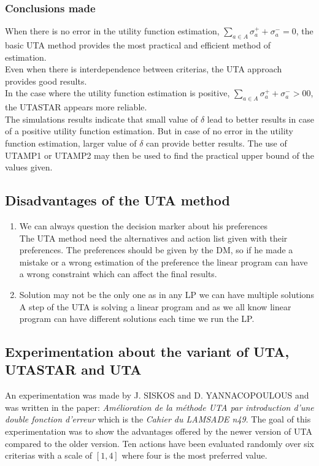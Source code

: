\documentclass{report}
\begin{document}
\subsubsection{Conclusions made}
When there is no error in the utility function estimation, $ \sum_{a \in A} \sigma _{a}^{+} + \sigma _{a}^{-} = 0$, the basic UTA method provides the most practical and efficient method of estimation. \\
Even when there is interdependence between criterias, the UTA approach provides good results. \\
In the case where the utility function estimation is positive, $ \sum_{a \in A} \sigma _{a}^{+} + \sigma _{a}^{-} >0 0$, the UTASTAR appears more reliable.\\
The simulations results indicate that small value of $\delta$ lead to better results in case of a positive utility function estimation. But in case of no error in the utility function estimation, larger value of $\delta$ can provide better results. The use of UTAMP1 or UTAMP2 may then be used to find the practical upper bound of the values given. 

\subsection{Disadvantages of the UTA method}
\begin{enumerate}
\item We can always question the decision marker about his preferences\\
The UTA method need the alternatives and action list given with their preferences. The preferences should be given by the DM, so if he made a mistake or a wrong estimation of the preference the linear program can have a wrong constraint which can affect the final results. 
\item Solution may not be the only one as in any LP we can have multiple solutions\\
A step of the UTA is solving a linear program and as we all know linear program can have different solutions each time we run the LP.
\end{enumerate}

\subsection{Experimentation about the variant of UTA, UTASTAR and UTA}
An experimentation was made by J. SISKOS and D. YANNACOPOULOUS and was written in the paper: \textit{Amélioration de la méthode UTA par introduction d'une double fonction d'erreur} which is the \textit{Cahier du LAMSADE n49}. The goal of this experimentation was to show the advantages offered by the newer version of UTA compared to the older version. Ten actions have been evaluated randomly over six criterias with a scale of $[1,4]$ where four is the most preferred value.\\
\end{document}
